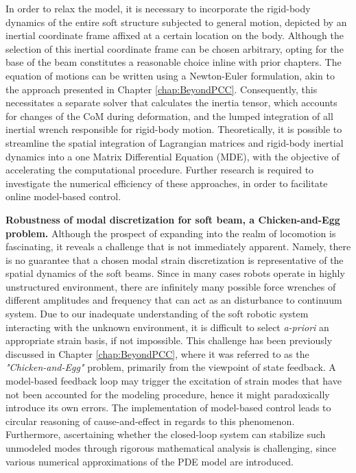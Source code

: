 In order to relax the model, it is necessary to incorporate the rigid-body dynamics of the entire soft structure subjected to general motion, depicted by an inertial coordinate frame affixed at a certain location on the body. Although the selection of this inertial coordinate frame can be chosen arbitrary, opting for the base of the beam constitutes a reasonable choice inline with prior chapters. The equation of motions can be written using a Newton-Euler formulation, akin to the approach presented in Chapter \ref{chap:BeyondPCC}. Consequently, this necessitates a separate solver that calculates the inertia tensor, which accounts for changes of the CoM during deformation, and the lumped integration of all inertial wrench responsible for rigid-body motion. Theoretically, it is possible to streamline the spatial integration of Lagrangian matrices and rigid-body inertial dynamics into a one Matrix Differential Equation (MDE), with the objective of accelerating the computational procedure. Further research is required to investigate the numerical efficiency of these approaches, in order to facilitate online model-based control.

\textbf{Robustness of modal discretization for soft beam, a Chicken-and-Egg problem.} Although the prospect of expanding into the realm of locomotion is fascinating, it reveals a challenge that is not immediately apparent. Namely, there is no guarantee that a chosen modal strain discretization is representative of the spatial dynamics of the soft beams. Since in many cases robots operate in highly unstructured environment, there are infinitely many possible force wrenches of different amplitudes and frequency that can act as an disturbance to continuum system. Due to our inadequate understanding of the soft robotic system interacting with the unknown environment, it is difficult to select \textit{a-priori} an appropriate strain basis, if not impossible. This challenge has been previously discussed in Chapter \ref{chap:BeyondPCC}, where it was referred to as the \textit{"Chicken-and-Egg"} problem, primarily from the viewpoint of state feedback. A model-based feedback loop may trigger the excitation of strain modes that have not been accounted for the modeling procedure, hence it might paradoxically introduce its own errors. The implementation of model-based control leads to circular reasoning of cause-and-effect in regards to this phenomenon. Furthermore, ascertaining whether the closed-loop system can stabilize such unmodeled modes through rigorous mathematical analysis is challenging, since various numerical approximations of the PDE model are introduced.

